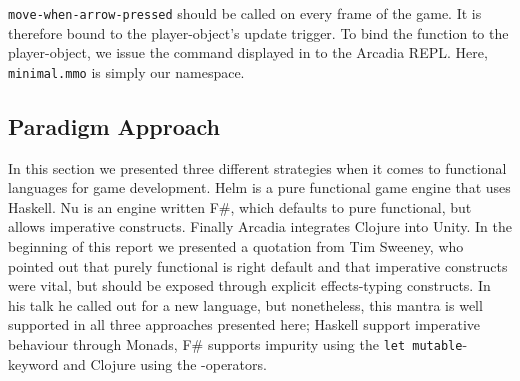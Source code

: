 \texttt{move-when-arrow-pressed} should be called on every frame of the game. It is therefore bound to the player-object's update trigger.
To bind the function to the player-object, we issue the command displayed in  to the Arcadia REPL. Here, \texttt{minimal.mmo} is simply our namespace.

\subsection{Paradigm Approach} \label{sec:para-approach} 
In this section we presented three different strategies when it comes to functional languages for game development. Helm is a pure functional game engine that uses Haskell. Nu is an engine written F\#, which defaults to pure functional, but allows imperative constructs. Finally Arcadia integrates Clojure into Unity. In the beginning of this report we presented a quotation from Tim Sweeney, who pointed out that purely functional is right default and that imperative constructs were vital, but should be exposed through explicit effects-typing constructs. In his talk he called out for a new language, but nonetheless, this mantra is well supported in all three approaches presented here; Haskell support imperative behaviour through Monads, F\# supports impurity using the \texttt{let mutable}-keyword and Clojure using the \ttt{!}-operators.